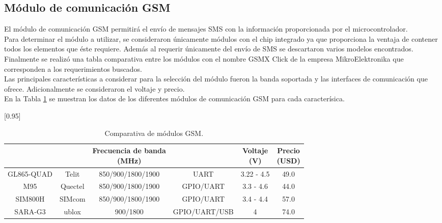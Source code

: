 
\subsection{Módulo de comunicación GSM}
El módulo de comunicación GSM permitirá el envío de mensajes SMS con la información proporcionada por el microcontrolador. \\

Para determinar el módulo a utilizar, se consideraron únicamente módulos con el chip integrado ya que proporciona la ventaja de contener todos los elementos que éste requiere. Además al requerir únicamente del envío de SMS se descartaron varios modelos encontrados. \\

Finalmente se realizó una tabla comparativa entre los módulos con el nombre GSMX Click de la empresa MikroElektronika que corresponden a los requerimientos buscados. \\

Las principales características a considerar para la selección del módulo fueron la banda soportada y las interfaces de comunicación que ofrece. Adicionalmente se consideraron el voltaje y precio. \\

En la Tabla \ref{analisis:moduloGSM} se muestran los datos de los diferentes módulos de comunicación GSM para cada caracterísica.

\begin{table}[htbp]
	\begin{center}
		\scalebox{0.93}[0.95]{
		\begin{tabular}{|c|c|c|c|c|c|}
			\hline
			\thead{Modelo}&\thead{Fabricante}&\thead{Frecuencia de banda\\(MHz)}&\thead{Interfaces}&\thead{Voltaje \\ (V)}&\thead{Precio\\(USD)}\\
			\hline
			\hline
			GL865-QUAD & Telit&850/900/1800/1900&UART&3.22 - 4.5&49.0\\
			\hline
			M95 & Quectel&850/900/1800/1900&GPIO/UART&3.3 - 4.6& 44.0\\
			\hline
			SIM800H & SIMcom&850/900/1800/1900&GPIO/UART&3.4 - 4.4&57.0\\
			\hline
			SARA-G3 & ublox&900/1800&GPIO/UART/USB&4&74.0\\
			\hline
		\end{tabular}}
		\caption{Comparativa de módulos GSM.}
		\label{analisis:moduloGSM}
	\end{center}
\end{table}
	
